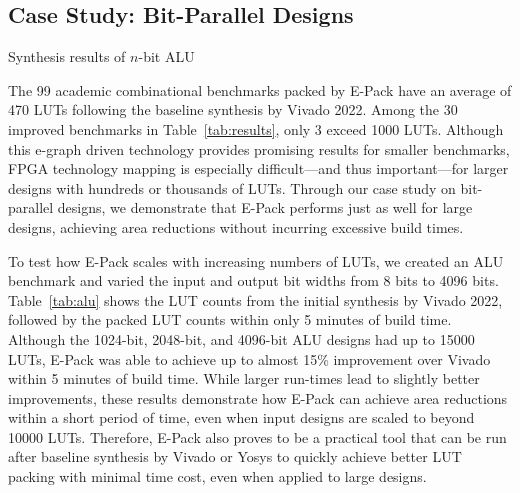 \subsection{Case Study: Bit-Parallel Designs}\label{sec:results:scalability}
\begin{table}
    \centering
    \caption{Synthesis results of $n$-bit ALU}\label{tab:alu}
\end{table}
The 99 academic combinational benchmarks packed by E-Pack have an average of 470 LUTs following the baseline synthesis by Vivado 2022. Among the 30 improved benchmarks in Table~\ref{tab:results}, only 3 exceed 1000 LUTs. Although this e-graph driven technology provides promising results for smaller benchmarks, FPGA technology mapping is especially difficult—and thus important—for larger designs with hundreds or thousands of LUTs. Through our case study on bit-parallel designs, we demonstrate that E-Pack performs just as well for large designs, achieving area reductions without incurring excessive build times.

To test how E-Pack scales with increasing numbers of LUTs, we created an ALU benchmark and varied the input and output bit widths from 8 bits to 4096 bits. Table~\ref{tab:alu} shows the LUT counts from the initial synthesis by Vivado 2022, followed by the packed LUT counts within only 5 minutes of build time. Although the 1024-bit, 2048-bit, and 4096-bit ALU designs had up to 15000 LUTs, E-Pack was able to achieve up to almost 15\% improvement over Vivado within 5 minutes of build time. While larger run-times lead to slightly better improvements, these results demonstrate how E-Pack can achieve area reductions within a short period of time, even when input designs are scaled to beyond 10000 LUTs. Therefore, E-Pack also proves to be a practical tool that can be run after baseline synthesis by Vivado or Yosys to quickly achieve better LUT packing with minimal time cost, even when applied to large designs.
